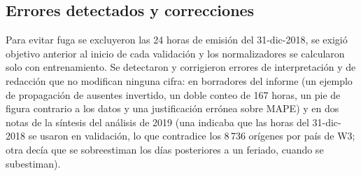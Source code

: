 \subsection{Errores detectados y correcciones}

Para evitar fuga se excluyeron las 24 horas de emisión del 31-dic-2018, se exigió objetivo anterior al inicio de cada validación y los normalizadores se calcularon solo con entrenamiento. Se detectaron y corrigieron errores de interpretación y de redacción que no modifican ninguna cifra: en borradores del informe (un ejemplo de propagación de ausentes invertido, un doble conteo de 167 horas, un pie de figura contrario a los datos y una justificación errónea sobre MAPE) y en dos notas de la síntesis del análisis de 2019 (una indicaba que las horas del 31-dic-2018 se usaron en validación, lo que contradice los 8\,736 orígenes por país de W3; otra decía que se sobreestiman los días posteriores a un feriado, cuando se subestiman).
